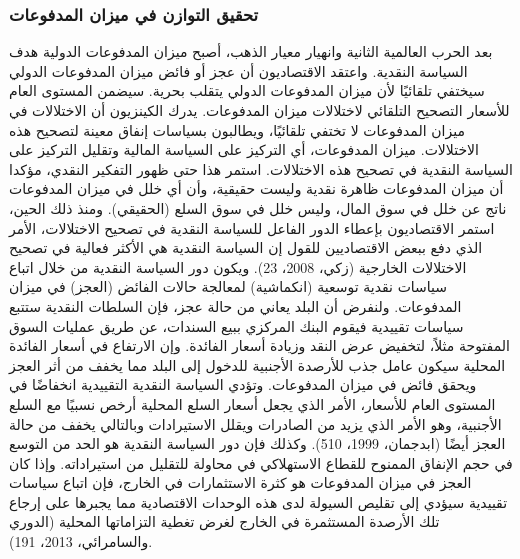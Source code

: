 \documentclass[10pt,a4paper]{report}
\begin{document}
\begin{doublespacing}
\subsubsection{تحقيق التوازن في ميزان المدفوعات}
بعد الحرب العالمية الثانية وانهيار معيار الذهب، أصبح ميزان المدفوعات الدولية هدف السياسة النقدية. واعتقد الاقتصاديون أن عجز أو فائض ميزان المدفوعات الدولي سيختفي تلقائيًا لأن ميزان المدفوعات الدولي يتقلب بحرية. سيضمن المستوى العام للأسعار التصحيح التلقائي لاختلالات ميزان المدفوعات. يدرك الكينزيون أن الاختلالات في ميزان المدفوعات لا تختفي تلقائيًا، ويطالبون بسياسات إنفاق معينة لتصحيح هذه الاختلالات. ميزان المدفوعات، أي التركيز على السياسة المالية وتقليل التركيز على السياسة النقدية في تصحيح هذه الاختلالات. استمر هذا حتى ظهور التفكير النقدي، مؤكدا أن ميزان المدفوعات ظاهرة نقدية وليست حقيقية، وأن أي خلل في ميزان المدفوعات ناتج عن خلل في سوق المال، وليس خلل في سوق السلع (الحقيقي). ومنذ ذلك الحين، استمر الاقتصاديون بإعطاء الدور الفاعل للسياسة النقدية في تصحيح الاختلالات، الأمر الذي دفع ببعض الاقتصاديين للقول إن السياسة النقدية هي الأكثر فعالية في تصحيح الاختلالات الخارجية ({زكي، 2008، 23}). ويكون دور السياسة النقدية من خلال اتباع سياسات نقدية توسعية (انكماشية) لمعالجة حالات الفائض (العجز) في ميزان المدفوعات. ولنفرض أن البلد يعاني من حالة عجز، فإن السلطات النقدية ستتبع سياسات تقييدية فيقوم البنك المركزي ببيع السندات، عن طريق عمليات السوق المفتوحة مثلاً، لتخفيض عرض النقد وزيادة أسعار الفائدة. وإن الارتفاع في أسعار الفائدة المحلية سيكون عامل جذب للأرصدة الأجنبية للدخول إلى البلد مما يخفف من أثر العجز ويحقق فائض في ميزان المدفوعات. وتؤدي السياسة النقدية التقييدية انخفاضًا في المستوى العام للأسعار، الأمر الذي يجعل أسعار السلع المحلية أرخص نسبيًا مع السلع الأجنبية، وهو الأمر الذي يزيد من الصادرات ويقلل الاستيرادات وبالتالي يخفف من حالة العجز أيضًا ({ابدجمان، 1999، 510}). وكذلك فإن دور السياسة النقدية هو الحد من التوسع في حجم الإنفاق الممنوح للقطاع الاستهلاكي في محاولة للتقليل من استيراداته. وإذا كان العجز في ميزان المدفوعات هو كثرة الاستثمارات في الخارج، فإن اتباع سياسات تقييدية سيؤدي إلى تقليص السيولة لدى هذه الوحدات الاقتصادية مما يجبرها على إرجاع تلك الأرصدة المستثمرة في الخارج لغرض تغطية التزاماتها المحلية ({الدوري والسامرائي، 2013، 191}).

\end{doublespacing}
\end{document}

